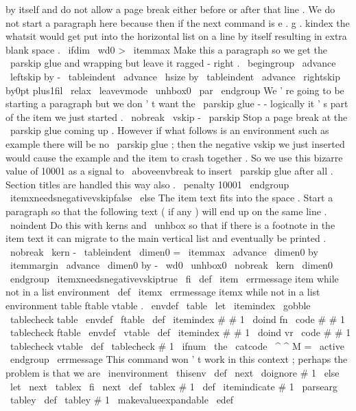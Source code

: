 {{{{{%
by
itself
and
do
not
allow
a
page
break
either
before
or
after
that
%
line
.
We
do
not
start
a
paragraph
here
because
then
if
the
next
%
command
is
e
.
g
.
kindex
the
whatsit
would
get
put
into
the
%
horizontal
list
on
a
line
by
itself
resulting
in
extra
blank
space
.
\
ifdim
\
wd0
>
\
itemmax
%
%
Make
this
a
paragraph
so
we
get
the
\
parskip
glue
and
wrapping
%
but
leave
it
ragged
-
right
.
\
begingroup
\
advance
\
leftskip
by
-
\
tableindent
\
advance
\
hsize
by
\
tableindent
\
advance
\
rightskip
by0pt
plus1fil
\
relax
\
leavevmode
\
unhbox0
\
par
\
endgroup
%
%
We
'
re
going
to
be
starting
a
paragraph
but
we
don
'
t
want
the
%
\
parskip
glue
-
-
logically
it
'
s
part
of
the
item
we
just
started
.
\
nobreak
\
vskip
-
\
parskip
%
%
Stop
a
page
break
at
the
\
parskip
glue
coming
up
.
However
if
%
what
follows
is
an
environment
such
as
example
there
will
be
no
%
\
parskip
glue
;
then
the
negative
vskip
we
just
inserted
would
%
cause
the
example
and
the
item
to
crash
together
.
So
we
use
this
%
bizarre
value
of
10001
as
a
signal
to
\
aboveenvbreak
to
insert
%
\
parskip
glue
after
all
.
Section
titles
are
handled
this
way
also
.
%
\
penalty
10001
\
endgroup
\
itemxneedsnegativevskipfalse
\
else
%
The
item
text
fits
into
the
space
.
Start
a
paragraph
so
that
the
%
following
text
(
if
any
)
will
end
up
on
the
same
line
.
\
noindent
%
Do
this
with
kerns
and
\
unhbox
so
that
if
there
is
a
footnote
in
%
the
item
text
it
can
migrate
to
the
main
vertical
list
and
%
eventually
be
printed
.
\
nobreak
\
kern
-
\
tableindent
\
dimen0
=
\
itemmax
\
advance
\
dimen0
by
\
itemmargin
\
advance
\
dimen0
by
-
\
wd0
\
unhbox0
\
nobreak
\
kern
\
dimen0
\
endgroup
\
itemxneedsnegativevskiptrue
\
fi
}
\
def
\
item
{
\
errmessage
{
item
while
not
in
a
list
environment
}
}
\
def
\
itemx
{
\
errmessage
{
itemx
while
not
in
a
list
environment
}
}
%
table
ftable
vtable
.
\
envdef
\
table
{
%
\
let
\
itemindex
\
gobble
\
tablecheck
{
table
}
%
}
\
envdef
\
ftable
{
%
\
def
\
itemindex
#
#
1
{
\
doind
{
fn
}
{
\
code
{
#
#
1
}
}
}
%
\
tablecheck
{
ftable
}
%
}
\
envdef
\
vtable
{
%
\
def
\
itemindex
#
#
1
{
\
doind
{
vr
}
{
\
code
{
#
#
1
}
}
}
%
\
tablecheck
{
vtable
}
%
}
\
def
\
tablecheck
#
1
{
%
\
ifnum
\
the
\
catcode
\
^
^
M
=
\
active
\
endgroup
\
errmessage
{
This
command
won
'
t
work
in
this
context
;
perhaps
the
problem
is
that
we
are
\
inenvironment
\
thisenv
}
%
\
def
\
next
{
\
doignore
{
#
1
}
}
%
\
else
\
let
\
next
\
tablex
\
fi
\
next
}
\
def
\
tablex
#
1
{
%
\
def
\
itemindicate
{
#
1
}
%
\
parsearg
\
tabley
}
\
def
\
tabley
#
1
{
%
{
%
\
makevalueexpandable
\
edef
}}}}}}
